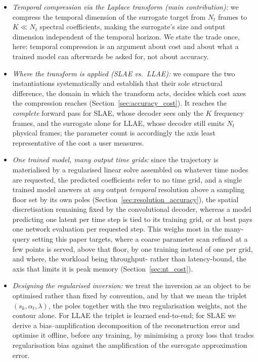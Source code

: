 ﻿\documentclass[a4paper,12pt]{article}
\theoremstyle{definition}
\theoremstyle{remark}
\begin{document}
\begin{itemize}
    \item \emph{Temporal compression via the Laplace transform (main contribution):} we compress the temporal dimension of the surrogate target from $N_t$ frames to $K \ll N_t$ spectral coefficients, making the surrogate's size and output dimension independent of the temporal horizon. We state the trade once, here: temporal compression is an argument about cost and about what a trained model can afterwards be asked for, not about accuracy.
    \item \emph{Where the transform is applied (SLAE vs.\ LLAE):} we compare the two instantiations systematically and establish that their sole structural difference, the domain in which the transform acts, decides which cost axes the compression reaches (Section~\ref{sec:accuracy_cost}). It reaches the \emph{complete} forward pass for SLAE, whose decoder sees only the $K$ frequency frames, and the surrogate alone for LLAE, whose decoder still emits $N_t$ physical frames; the parameter count is accordingly the axis least representative of the cost a user measures.
    \item \emph{One trained model, many output time grids:} since the trajectory is materialised by a regularised linear solve assembled on whatever time nodes are requested, the predicted coefficients refer to no time grid, and a single trained model answers at \emph{any} output \emph{temporal} resolution above a sampling floor set by its own poles (Section~\ref{sec:resolution_accuracy}), the spatial discretisation remaining fixed by the convolutional decoder, whereas a model predicting one latent per time step is tied to its training grid, or at best pays one network evaluation per requested step. This weighs most in the many-query setting this paper targets, where a coarse parameter scan refined at a few points is served, above that floor, by one training instead of one per grid, and where, the workload being throughput- rather than latency-bound, the axis that limits it is peak memory (Section~\ref{sec:nt_cost}).
    \item \emph{Designing the regularised inversion:} we treat the inversion as an object to be optimised rather than fixed by convention, and by that we mean the triplet $(s_k, \alpha_t, \lambda)$, the poles together with the two regularisation weights, not the contour alone. For LLAE the triplet is learned end-to-end; for SLAE we derive a bias--amplification decomposition of the reconstruction error and optimise it offline, before any training, by minimising a proxy loss that trades regularisation bias against the amplification of the surrogate approximation error.

\end{itemize}
\end{document}
